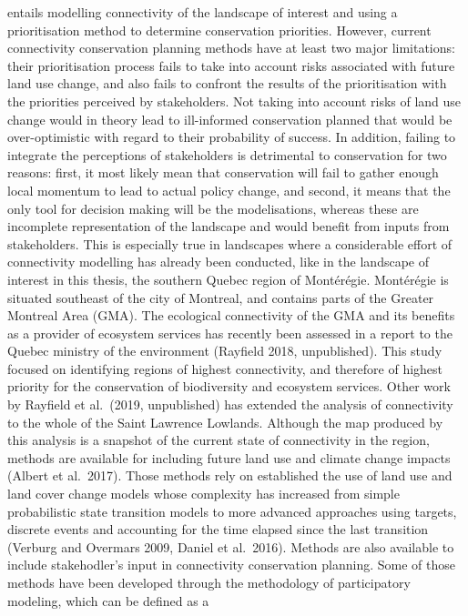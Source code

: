 \documentclass[]{article}
\begin{document}
entails modelling connectivity of the landscape of interest and using a
prioritisation method to determine conservation priorities. However,
current connectivity conservation planning methods have at least two
major limitations: their prioritisation process fails to take into
account risks associated with future land use change, and also fails to
confront the results of the prioritisation with the priorities perceived
by stakeholders. Not taking into account risks of land use change would
in theory lead to ill-informed conservation planned that would be
over-optimistic with regard to their probability of success. In
addition, failing to integrate the perceptions of stakeholders is
detrimental to conservation for two reasons: first, it most likely mean
that conservation will fail to gather enough local momentum to lead to
actual policy change, and second, it means that the only tool for
decision making will be the modelisations, whereas these are incomplete
representation of the landscape and would benefit from inputs from
stakeholders. This is especially true in landscapes where a considerable
effort of connectivity modelling has already been conducted, like in the
landscape of interest in this thesis, the southern Quebec region of
Montérégie. Montérégie is situated southeast of the city of Montreal,
and contains parts of the Greater Montreal Area (GMA). The ecological
connectivity of the GMA and its benefits as a provider of ecosystem
services has recently been assessed in a report to the Quebec ministry
of the environment (Rayfield 2018, unpublished). This study focused on
identifying regions of highest connectivity, and therefore of highest
priority for the conservation of biodiversity and ecosystem services.
Other work by Rayfield et al.~(2019, unpublished) has extended the
analysis of connectivity to the whole of the Saint Lawrence Lowlands.
Although the map produced by this analysis is a snapshot of the current
state of connectivity in the region, methods are available for including
future land use and climate change impacts (Albert et al.~2017). Those
methods rely on established the use of land use and land cover change
models whose complexity has increased from simple probabilistic state
transition models to more advanced approaches using targets, discrete
events and accounting for the time elapsed since the last transition
(Verburg and Overmars 2009, Daniel et al.~2016). Methods are also
available to include stakehodler's input in connectivity conservation
planning. Some of those methods have been developed through the
methodology of participatory modeling, which can be defined as a
\end{document}
